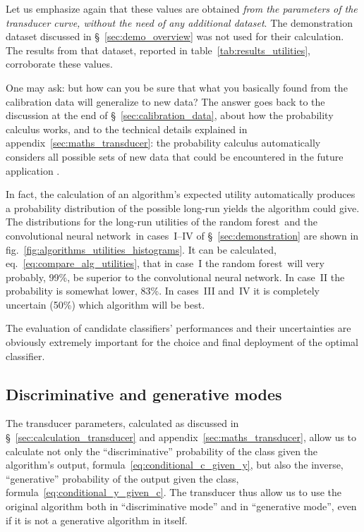 \documentclass[a4paper,12pt,%
onecolumn,oneside,article,%
british%
]{memoir}
\renewcommand*{\|}[1][]{\nonscript\:#1\vert\nonscript\:\mathopen{}}
\newcommand*{\sect}{\S}%
\newcommand*{\eqn}{eq.}%
\newcommand*{\fig}{fig.}%
\newcommand*{\cf}{{cf.}}
\newcommand*{\RF}{random forest}
\newcommand*{\CNN}{convolutional neural network}
\begin{document}
Let us emphasize again that these values are obtained \emph{from the parameters of the transducer curve, without the need of any additional dataset}. The demonstration dataset discussed in \sect~\ref{sec:demo_overview} was not used for their calculation. The results from that dataset, reported in table~\ref{tab:results_utilities}, corroborate these values.


One may ask: but how can you be sure that what you basically found from the calibration data will generalize to new data? The answer goes back to the discussion at the end of \sect~\ref{sec:calibration_data}, about how the probability calculus works, and to the technical details explained in appendix~\ref{sec:maths_transducer}: the probability calculus automatically considers all possible sets of new data that could be encountered in the future application \autocites[\cf][]{smithetal2006}.

In fact, the calculation of an algorithm's expected utility automatically produces a probability distribution of the possible long-run yields the algorithm could give. The distributions for the long-run utilities of the \RF\ and the \CNN\ in cases~I--IV of \sect~\ref{sec:demonstration} are shown in \fig~\ref{fig:algorithms_utilities_histograms}. It can be calculated, \eqn~\eqref{eq:compare_alg_utilities}, that in case~I the \RF\ will very probably, 99\%, be superior to the \CNN. In case~II the probability is somewhat lower, 83\%. In cases~III and~IV it is completely uncertain (50\%) which algorithm will be best.

The evaluation of candidate classifiers' performances and their uncertainties are obviously extremely important for the choice and final deployment of the optimal classifier.

\subsection{Discriminative and generative modes}
\label{sec:effect_transd}

The transducer parameters, calculated as discussed in \sect~\ref{sec:calculation_transducer} and appendix~\ref{sec:maths_transducer}, allow us to calculate not only the \enquote{discriminative} probability of the class given the algorithm's output, formula~\eqref{eq:conditional_c_given_y}, but also the inverse, \enquote{generative} probability \autocites[\sect~21.2.3]{russelletal1995_r2022}[\sect~8.6]{murphy2012} of the output given the class, formula~\eqref{eq:conditional_y_given_c}. The transducer thus allow us to use the original algorithm both in \enquote{discriminative mode} and in \enquote{generative mode}, even if it is not a generative algorithm in itself.
\end{document}

